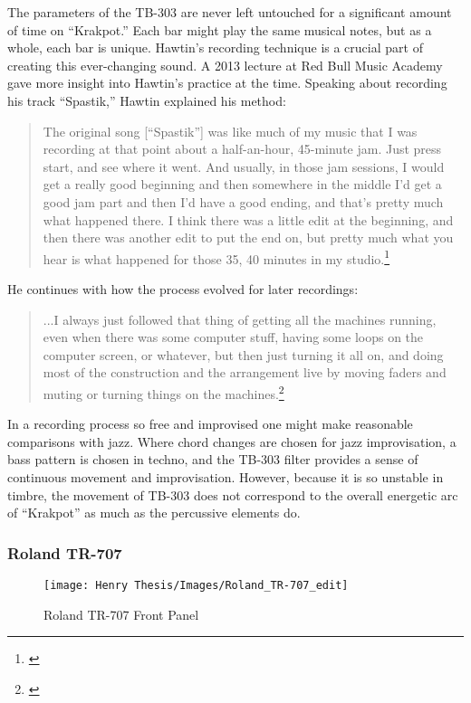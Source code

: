 \documentclass[12pt,twoside]{reedthesis}
\begin{document}
The parameters of the TB-303 are never left untouched for a significant amount of time on ``Krakpot.'' Each bar might play the same musical notes, but as a whole, each bar is unique. Hawtin's recording technique is a crucial part of creating this ever-changing sound. A 2013 lecture at Red Bull Music Academy gave more insight into Hawtin's practice at the time. Speaking about recording his track ``Spastik,'' Hawtin explained his method:
\begin{quote}
The original song [``Spastik''] was like much of my music that I was recording at that point about a half-an-hour, 45-minute jam. Just press start, and see where it went. And usually, in those jam sessions, I would get a really good beginning and then somewhere in the middle I’d get a good jam part and then I’d have a good ending, and that’s pretty much what happened there. I think there was a little edit at the beginning, and then there was another edit to put the end on, but pretty much what you hear is what happened for those 35, 40 minutes in my studio.\footnote{\cite{burnsRichieHawtinLecture2013}}
\end{quote}
He continues with how the process evolved for later recordings:
\begin{quote}
    ...I always just followed that thing of getting all the machines running, even when there was some computer stuff, having some loops on the computer screen, or whatever, but then just turning it all on, and doing most of the construction and the arrangement live by moving faders and muting or turning things on the machines.\footnote{\cite{burnsRichieHawtinLecture2013}} 
\end{quote}

In a recording process so free and improvised one might make reasonable comparisons with jazz. Where chord changes are chosen for jazz improvisation, a bass pattern is chosen in techno, and the TB-303 filter provides a sense of continuous movement and improvisation. However, because it is so unstable in timbre, the movement of TB-303 does not correspond to the overall energetic arc of ``Krakpot'' as much as the percussive elements do.

\subsubsection{Roland TR-707}

\begin{figure}[htbp]
\begin{centering} 
\texttt{[image: Henry Thesis/Images/Roland\_TR-707\_edit]}
\caption{Roland TR-707 Front Panel}
\label{fig:TR707}
\end{centering} 
\end{figure}
\end{document}

